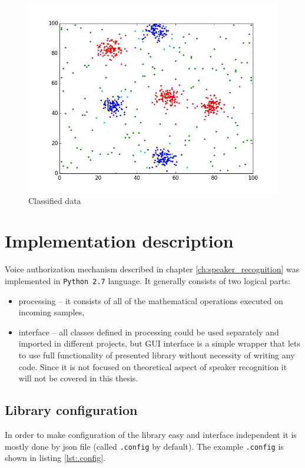 \documentclass[magister]{dyplom}
\begin{document}
	\begin{figure}
		\centering
		\includegraphics[width=0.6\linewidth]{images/gmm_classified}
		\caption{Classified data}
		\label{fig:gmm_classified}
	\end{figure}

	
	\chapter{Implementation description}
	
	Voice authorization mechanism described in chapter \ref{ch:speaker_recognition} was implemented in \texttt{Python 2.7} language. It generally consists of two logical parts:
	
	\begin{itemize}
		\item processing -- it consists of all of the mathematical operations executed on incoming samples,
		\item interface -- all classes defined in processing could be used separately and imported in different projects, but GUI interface is a simple wrapper that lets to use full functionality of presented library without necessity of writing any code. Since it is not focused on theoretical aspect of speaker recognition it will not be covered in this thesis.
	\end{itemize}
	
	\section{Library configuration}
	
	In order to make configuration of the library easy and interface independent it is mostly done by json file (called \texttt{.config} by default). The example \texttt{.config} is shown in listing \ref{lst:.config}.\\
	
	\begingroup
	\inputminted[linenos=true]{json}{../automatic_speaker_recognition/.config}
	\endgroup
	
\end{document}
